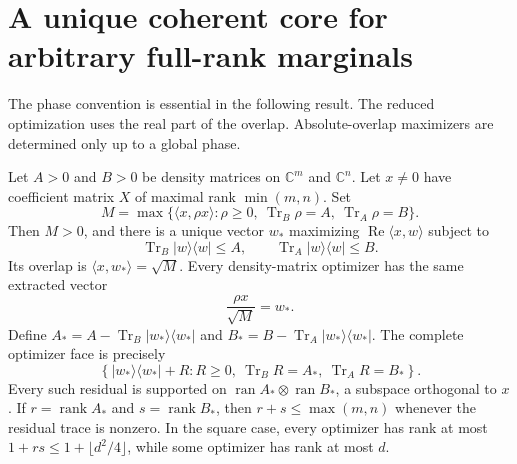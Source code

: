 \section{A unique coherent core for arbitrary full-rank marginals}\label{sec:unique-core}

The phase convention is essential in the following result. The reduced
optimization uses the real part of the overlap. Absolute-overlap maximizers
are determined only up to a global phase.

\begin{theorem}\label{thm:unique-core}
Let $A>0$ and $B>0$ be density matrices on $\mathbb C^m$ and
$\mathbb C^n$. Let $x\ne0$ have coefficient matrix $X$ of maximal rank
$\min(m,n)$. Set
\[
 M=\max\{\langle x,\rho x\rangle:
       \rho\ge0,\ \operatorname{Tr}_B\rho=A,\
       \operatorname{Tr}_A\rho=B\}.
\]
Then $M>0$, and there is a unique vector $w_*$ maximizing
$\operatorname{Re}\langle x,w\rangle$ subject to
\[
 \operatorname{Tr}_B|w\rangle\langle w|\le A,
 \qquad \operatorname{Tr}_A|w\rangle\langle w|\le B.
\]
Its overlap is $\langle x,w_*\rangle=\sqrt M$. Every density-matrix
optimizer has the same extracted vector
\[
                   \frac{\rho x}{\sqrt M}=w_*.
\]
Define $A_*=A-\operatorname{Tr}_B|w_*\rangle\langle w_*|$ and
$B_*=B-\operatorname{Tr}_A|w_*\rangle\langle w_*|$. The complete optimizer
face is precisely
\[
 \left\{|w_*\rangle\langle w_*|+R:
 R\ge0,\ \operatorname{Tr}_B R=A_*,\
 \operatorname{Tr}_A R=B_*\right\}.
\]
Every such residual is supported on
$\operatorname{ran}A_*\otimes\operatorname{ran}B_*$, a subspace
orthogonal to $x$. If $r=\operatorname{rank}A_*$ and
$s=\operatorname{rank}B_*$, then $r+s\le\max(m,n)$ whenever the residual
trace is nonzero. In the square case, every optimizer has rank at most
$1+rs\le1+\lfloor d^2/4\rfloor$, while some optimizer has rank at most $d$.
\end{theorem}

